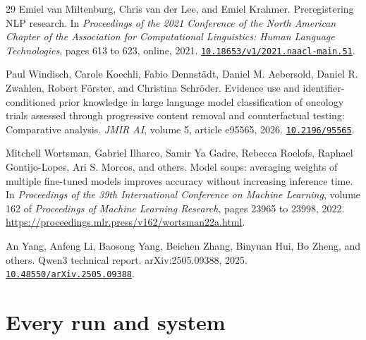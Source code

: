 \documentclass[11pt,letterpaper]{article}
\newcommand{\doi}[1]{\href{https://doi.org/#1}{\nolinkurl{#1}}}
\begin{document}
\begin{thebibliography}{29}
Emiel van Miltenburg, Chris van der Lee, and Emiel Krahmer.
\newblock Preregistering {NLP} research.
\newblock In \emph{Proceedings of the 2021 Conference of the North American Chapter of the Association for Computational Linguistics: Human Language Technologies}, pages 613 to 623, online, 2021.
\newblock \doi{10.18653/v1/2021.naacl-main.51}.

Paul Windisch, Carole Koechli, Fabio Dennst{\"a}dt, Daniel M. Aebersold, Daniel R. Zwahlen, Robert F{\"o}rster, and Christina Schr{\"o}der.
\newblock Evidence use and identifier-conditioned prior knowledge in large language model classification of oncology trials assessed through progressive content removal and counterfactual testing: Comparative analysis.
\newblock \emph{JMIR AI}, volume 5, article e95565, 2026.
\newblock \doi{10.2196/95565}.

Mitchell Wortsman, Gabriel Ilharco, Samir Ya Gadre, Rebecca Roelofs, Raphael Gontijo-Lopes, Ari S. Morcos, and others.
\newblock Model soups: averaging weights of multiple fine-tuned models improves accuracy without increasing inference time.
\newblock In \emph{Proceedings of the 39th International Conference on Machine Learning}, volume 162 of \emph{Proceedings of Machine Learning Research}, pages 23965 to 23998, 2022.
\newblock \url{https://proceedings.mlr.press/v162/wortsman22a.html}.

An Yang, Anfeng Li, Baosong Yang, Beichen Zhang, Binyuan Hui, Bo Zheng, and others.
\newblock Qwen3 technical report.
\newblock arXiv:2505.09388, 2025.
\newblock \doi{10.48550/arXiv.2505.09388}.

\end{thebibliography}

\clearpage
\appendix

\section{Every run and system}
\label{app:runs}
\end{document}
